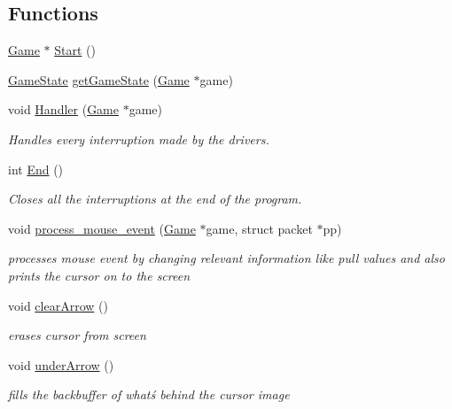 \subsection*{Functions}
\begin{DoxyCompactItemize}
\item 
\mbox{\hyperlink{struct_game}{Game}} $\ast$ \mbox{\hyperlink{group__game_gaaae55be55be73d9c3073893b52530b32}{Start}} ()
\item 
\mbox{\hyperlink{group__game_ga7899b65f1ea0f655e4bbf8d2a5714285}{Game\+State}} \mbox{\hyperlink{group__game_gaf4496cd5f0ca56890acbe30e9f10e438}{get\+Game\+State}} (\mbox{\hyperlink{struct_game}{Game}} $\ast$game)
\item 
void \mbox{\hyperlink{group__game_ga5b0e92642a5a6f7584bf752ebf7d91e6}{Handler}} (\mbox{\hyperlink{struct_game}{Game}} $\ast$game)
\begin{DoxyCompactList}\small\item\em Handles every interruption made by the drivers. \end{DoxyCompactList}\item 
int \mbox{\hyperlink{group__game_ga96a7acaf9d49759e564f941afcd87b68}{End}} ()
\begin{DoxyCompactList}\small\item\em Closes all the interruptions at the end of the program. \end{DoxyCompactList}\item 
void \mbox{\hyperlink{group__game_gad54324212d792e38302b19e409a413ae}{process\+\_\+mouse\+\_\+event}} (\mbox{\hyperlink{struct_game}{Game}} $\ast$game, struct packet $\ast$pp)
\begin{DoxyCompactList}\small\item\em processes mouse event by changing relevant information like pull values and also prints the cursor on to the screen \end{DoxyCompactList}\item 
void \mbox{\hyperlink{group__game_ga7ab4e7bd56aa5de2995f358a255aeb86}{clear\+Arrow}} ()
\begin{DoxyCompactList}\small\item\em erases cursor from screen \end{DoxyCompactList}\item 
void \mbox{\hyperlink{group__game_gaa6f544d0a9fe4df07759118388d9ec22}{under\+Arrow}} ()
\begin{DoxyCompactList}\small\item\em fills the backbuffer of whatś behind the cursor image \end{DoxyCompactList}\item 

\end{DoxyCompactItemize}
